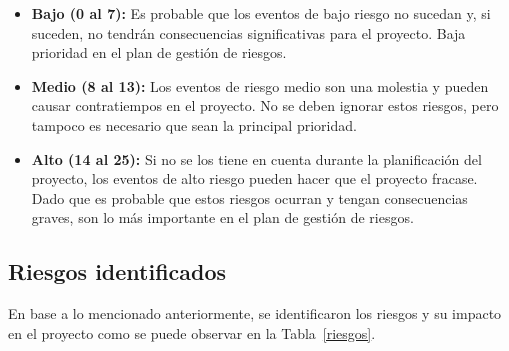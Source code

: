                 \begin{itemize}
                    \item \textbf{Bajo (0 al 7):} Es probable que los eventos de bajo riesgo no sucedan y, si suceden, no tendrán consecuencias significativas para el proyecto. Baja prioridad en el plan de gestión de riesgos.
    
                    \item \textbf{Medio (8 al 13):} Los eventos de riesgo medio son una molestia y pueden causar contratiempos en el proyecto. No se deben ignorar estos riesgos, pero tampoco es necesario que sean la principal prioridad.
    
                    \item \textbf{Alto (14 al 25):} Si no se los tiene en cuenta durante la planificación del proyecto, los eventos de alto riesgo pueden hacer que el proyecto fracase. Dado que es probable que estos riesgos ocurran y tengan consecuencias graves, son lo más importante en el plan de gestión de riesgos.
                \end{itemize}

        \subsection{Riesgos identificados}
    
            En base a lo mencionado anteriormente, se identificaron los riesgos y su impacto en el proyecto como se puede observar en la Tabla~\ref{riesgos}.


